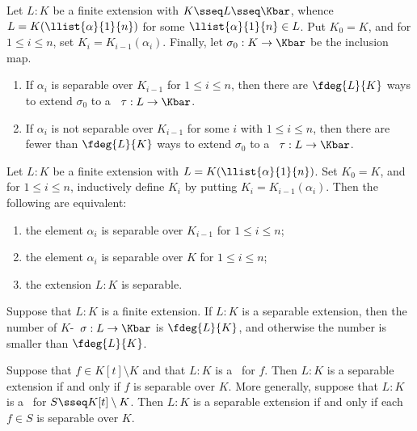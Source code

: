 \documentclass[a4paper]{article}
\begin{document}
\begin{ttheorem}
  Let \( L:K \) be a finite extension with \( K\sseq L\sseq \Kbar \), whence \( L=K(\llist{\alpha}{1}{n}) \) for some \( \llist{\alpha}{1}{n}\in L \).
  Put \( K_0=K \), and for \( 1\leq i\leq n \), set \( K_i=K_{i-1}(\alpha_i) \).
  Finally, let \( \sigma_0:K\to\Kbar \) be the inclusion map. \begin{enumerate}[label=(\roman*)]
    \item If \( \alpha_i \) is separable over \( K_{i-1} \) for \( 1\leq i\leq n \), then there are \( \fdeg{L}{K} \) ways to extend \( \sigma_0 \) to a \homo~\( \tau:L\to \Kbar \).
    \item If \( \alpha_i \) is not separable over \( K_{i-1} \) for some \( i \) with \( 1\leq i\leq n \), then there are fewer than \( \fdeg{L}{K} \) ways to extend \( \sigma_0 \) to a \homo~\( \tau:L\to \Kbar \).
  \end{enumerate}
\end{ttheorem}

\begin{ttheorem}
  Let \( L:K \) be a finite extension with \( L=K(\llist{\alpha}{1}{n}) \).
  Set \( K_0=K \), and for \( 1\leq i\leq n \), inductively define \( K_i \) by putting \( K_i=K_{i-1}(\alpha_i) \).
  Then the following are equivalent: \begin{enumerate}[label=(\roman*)]
    \item the element \( \alpha_i \) is separable over \( K_{i-1} \) for \( 1\leq i\leq n \);
    \item the element \( \alpha_i \) is separable over \( K \) for \( 1\leq i\leq n \);
    \item the extension \( L:K \) is separable.
  \end{enumerate}
\end{ttheorem}

\begin{tcorollary}
  Suppose that \( L:K \) is a finite extension.
  If \( L:K \) is a separable extension, then the number of \( K \)-\homo~\( \sigma:L\to\Kbar \) is \( \fdeg{L}{K} \), and otherwise the number is smaller than \( \fdeg{L}{K} \).
\end{tcorollary}

\begin{tcorollary}
  Suppose that \( f\in K[t]\setminus K \) and that \( L:K \) is a \sfe~for \( f \).
  Then \( L:K \) is a separable extension if and only if \( f \) is separable over \( K \).
  More generally, suppose that \( L:K \) is a \sfe~for \( S\sseq K[t]\setminus K \).
  Then \( L:K \) is a separable extension if and only if each \( f\in S \) is separable over \( K \).
\end{tcorollary}
\end{document}

